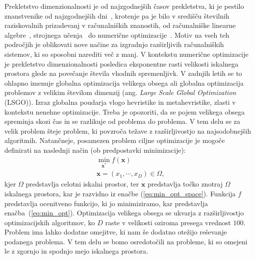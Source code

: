 Prekletstvo dimenzionalnosti je od najzgodnejših časov prekletstva, ki je pestilo znanstvenike od najzgodnejših dni~\cite{bib:curse_of_dim}, krotenje pa je bilo v središču številnih raziskovalnih prizadevanj v računalniških znanostih, od računalniške linearne algebre~\cite{bib:COD:linear_algebra}, strojnega učenja~\cite{bib:COD:machine_learning} do numerične optimizacije~\cite{bib:COD:numerical_methods}.
Motiv na vseh teh področjih je oblikovati nove načine za izgradnjo razširljivih računalniških sistemov, ki so sposobni narediti več z manj.
V kontekstu numerične optimizacije je prekletstvo dimenzionalnosti posledica eksponentne rasti velikosti iskalnega prostora glede na povečanje števila vhodnih spremenljivk.
V zadnjih letih se to ohlapno imenuje globalna optimizacija velikega obsega ali globalna optimizacija problemov z velikim številom dimenzij (ang. \textit{Large Scale Global Optimization} (LSGO)).
Izraz globalna poudarja vlogo hevristike in metahevristike, zlasti v kontekstu nenehne optimizacije.
Treba je opozoriti, da se pojem velikega obsega spreminja skozi čas in se razlikuje od problema do problema.
V tem delu se za velik problem šteje problem, ki povzroča težave z razširljivostjo na najsodobnejših algoritmih.
Natančneje, posamezen problem ciljne optimizacije je mogoče definirati na naslednji način (ob predpostavki minimizacije):
\begin{align}
	&\min_{\mathbf{x}^*}{f(\mathbf{x})} \label{eq:min_opt}\\
	&\mathbf{x} = (x_1, \cdots, x_D) \in \Omega \label{eq:min_opt_space},
\end{align}
kjer $\Omega$ predstavlja celotni iskalni prostor, ter $\mathbf{x}$ predstavlja točko znotraj $\Omega$ iskalnega prostora, kar je razvidno iz enačbe (\ref{eq:min_opt_space}).
Funkcija $f$ predstavlja ocenitveno funkcijo, ki jo minimiziramo, kar predstavlja enačba~(\ref{eq:min_opt}).
Optimizacija velikega obsega se ukvarja z razširljivostjo optimizacijskih algoritmov, ko $D$ raste v velikosti oziroma presega vrednost $100$.
Problem ima lahko dodatne omejitve, ki nam še dodatno otežijo reševanje podanega problema.
V tem delu se bomo osredotočili na probleme, ki so omejeni le z zgornjo in spodnjo mejo iskalnega prostora.

